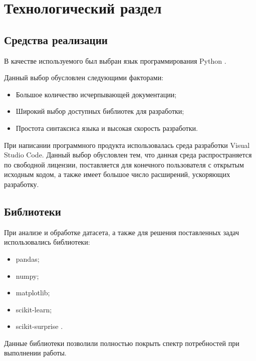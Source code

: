 \section{Технологический раздел}

\subsection{Средства реализации}

В качестве используемого был выбран язык программирования Python \cite{Python}.

Данный выбор обусловлен следующими факторами:
\begin{itemize}
	\item Большое количество исчерпывающей документации;
	\item Широкий выбор доступных библиотек для разработки;
	\item Простота синтаксиса языка и высокая скорость разработки.
\end{itemize} 

При написании программного продукта использовалась среда разработки Visual Studio Code. Данный выбор обусловлен тем, что данная среда распространяется по свободной лицензии, поставляется для конечного пользователя с открытым исходным кодом, а также имеет большое число расширений, ускоряющих разработку.

\subsection{Библиотеки}

При анализе и обработке датасета, а также для решения поставленных задач использовались библиотеки:
\begin{itemize}
	\item pandas;
	\item numpy;
	\item matplotlib;
	\item scikit-learn;
	\item scikit-surprise \cite{surprise}.
\end{itemize}

Данные библиотеки позволили полностью покрыть спектр потребностей при выполнении работы.